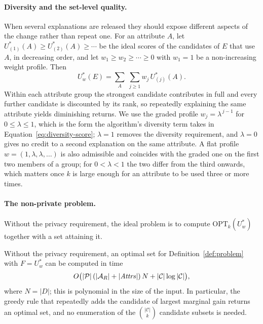 \paragraph{Diversity and the set-level quality.}
When several explanations are released they should expose different aspects of the change rather than repeat one.
For an attribute $A$, let $U^*_{(1)}(A)\ge U^*_{(2)}(A)\ge\cdots$ be the ideal scores of the candidates of $E$ that use $A$, in decreasing order, and let $w_1\ge w_2\ge\cdots\ge0$ with $w_1=1$ be a non-increasing weight profile.
Then
\begin{equation}
U^*_w(E)=\sum_{A}\;\sum_{j\ge1} w_j\,U^*_{(j)}(A).
\label{eq:ideal-set-utility}
\end{equation}
Within each attribute group the strongest candidate contributes in full and every further candidate is discounted by its rank, so repeatedly explaining the same attribute yields diminishing returns.
We use the graded profile $w_j=\lambda^{\,j-1}$ for $0\le\lambda\le1$, which is the form the algorithm's diversity term takes in Equation~\eqref{eq:diversity-score}; $\lambda=1$ removes the diversity requirement, and $\lambda=0$ gives no credit to a second explanation on the same attribute.
A flat profile $w=(1,\lambda,\lambda,\dots)$ is also admissible and coincides with the graded one on the first two members of a group; for $0<\lambda<1$ the two differ from the third onwards, which matters once $k$ is large enough for an attribute to be used three or more times.

\paragraph{The non-private problem.}
Without the privacy requirement, the ideal problem is to compute $\mathrm{OPT}_k(U^*_w)$ together with a set attaining it.

\begin{proposition}
\label{prop:nonprivate-exact}
Without the privacy requirement, an optimal set for Definition~\ref{def:problem} with $F=U^*_w$ can be computed in time
\[
O\big(|\mathcal{P}|\,(|\mathcal{A}_R|+|\mathit{Attrs}|)\,N+|\mathcal{C}|\log|\mathcal{C}|\big),
\]
where $N=|D|$; this is polynomial in the size of the input.
In particular, the greedy rule that repeatedly adds the candidate of largest marginal gain returns an optimal set, and no enumeration of the $\binom{|\mathcal{C}|}{k}$ candidate subsets is needed.
\end{proposition}

